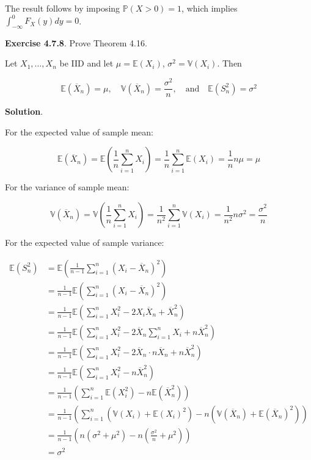 The result follows by imposing \(\mathbb{P}(X > 0) = 1\), which implies
\(\int_{-\infty}^0 F_X(y) dy = 0\).

\textbf{Exercise 4.7.8}. Prove Theorem 4.16.

Let \(X_1, \dots, X_n\) be IID and let \(\mu = \mathbb{E}(X_i)\),
\(\sigma^2 = \mathbb{V}(X_i)\). Then

\[ 
\mathbb{E}\left(\overline{X}_n\right) = \mu,
\quad
\mathbb{V}\left(\overline{X}_n\right) = \frac{\sigma^2}{n},
\quad \text{and} \quad
\mathbb{E}\left(S_n^2\right) = \sigma^2
\]

\textbf{Solution}.

For the expected value of sample mean:

\[ \mathbb{E}\left(\overline{X}_n\right) 
= \mathbb{E}\left( \frac{1}{n} \sum_{i=1}^n X_i \right)
= \frac{1}{n} \sum_{i=1}^n \mathbb{E}(X_i)
= \frac{1}{n} n\mu = \mu \]

For the variance of sample mean:

\[ \mathbb{V}\left(\overline{X}_n\right) 
= \mathbb{V}\left( \frac{1}{n} \sum_{i=1}^n X_i \right)
= \frac{1}{n^2} \sum_{i=1}^n \mathbb{V}(X_i)
= \frac{1}{n^2} n \sigma^2 = \frac{\sigma^2}{n} \]

For the expected value of sample variance:

\begin{align}
\mathbb{E}(S_n^2) &= \mathbb{E}\left(\frac{1}{n - 1} \sum_{i=1}^n \left(X_i - \overline{X}_n\right)^2 \right) \\
&= \frac{1}{n - 1} \mathbb{E} \left( \sum_{i=1}^n \left(X_i - \overline{X}_n\right)^2 \right) \\
&= \frac{1}{n - 1} \mathbb{E} \left( \sum_{i=1}^n X_i^2 - 2 X_i \overline{X}_n + \overline{X}_n^2 \right) \\
&= \frac{1}{n - 1} \mathbb{E} \left( \sum_{i=1}^n X_i^2 - 2 \overline{X}_n \sum_{i=1}^n X_i + n \overline{X}_n^2 \right) \\
&= \frac{1}{n - 1} \mathbb{E} \left( \sum_{i=1}^n X_i^2 - 2 \overline{X}_n \cdot n \overline{X}_n  + n \overline{X}_n^2 \right) \\
&= \frac{1}{n - 1} \mathbb{E} \left( \sum_{i=1}^n X_i^2 - n \overline{X}_n^2 \right) \\
&= \frac{1}{n - 1} \left( \sum_{i=1}^n  \mathbb{E}(X_i^2) - n \mathbb{E}\left( \overline{X}_n^2 \right) \right) \\
&= \frac{1}{n - 1} \left( \sum_{i=1}^n \left(\mathbb{V}(X_i) + \mathbb{E}(X_i)^2 \right) - n \left(\mathbb{V}\left( \overline{X}_n \right) + \mathbb{E}\left(\overline{X}_n\right)^2 \right)\right) \\
&= \frac{1}{n -1} \left( n \left( \sigma^2 + \mu^2\right) - n \left(\frac{\sigma^2}{n} + \mu^2 \right) \right) \\
&= \sigma^2
\end{align}

